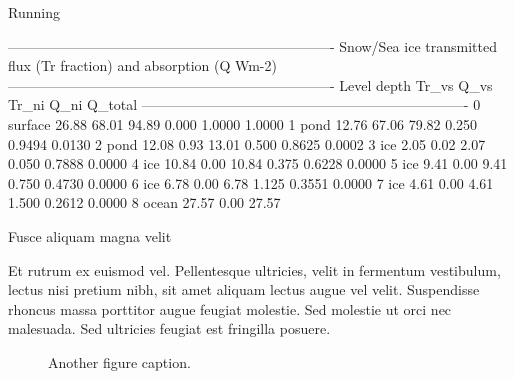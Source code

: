 \documentclass[final]{beamer}
\newlength{\colwidth}
\begin{document}
\begin{frame}[t,fragile]
\begin{columns}[t]
\begin{column}{\colwidth}
\begin{exampleblock}{Running }
\begin{python}
      ----------------------------------------------------------------------
      Snow/Sea ice transmitted flux (Tr fraction) and absorption (Q Wm-2)
      ----------------------------------------------------------------------
      Level      depth Tr\_vs  Q\_vs   Tr\_ni  Q\_ni   Q\_total
      ----------------------------------------------------------------------
      0 surface                  26.88         68.01  94.89
                 0.000 1.0000        1.0000
      1 pond                     12.76         67.06  79.82
                 0.250 0.9494        0.0130
      2 pond                     12.08          0.93  13.01
                 0.500 0.8625        0.0002
      3 ice                       2.05          0.02   2.07
                 0.050 0.7888        0.0000
      4 ice                      10.84          0.00  10.84
                 0.375 0.6228        0.0000
      5 ice                       9.41          0.00   9.41
                 0.750 0.4730        0.0000
      6 ice                       6.78          0.00   6.78
                 1.125 0.3551        0.0000
      7 ice                       4.61          0.00   4.61
                 1.500 0.2612        0.0000
      8 ocean                    27.57          0.00  27.57
    \end{python}
    

  \end{exampleblock}

  \begin{block}{Fusce aliquam magna velit}

    Et rutrum ex euismod vel. Pellentesque ultricies, velit in fermentum
    vestibulum, lectus nisi pretium nibh, sit amet aliquam lectus augue vel
    velit. Suspendisse rhoncus massa porttitor augue feugiat molestie. Sed
    molestie ut orci nec malesuada. Sed ultricies feugiat est fringilla
    posuere.

    \begin{figure}
      \centering
      \caption{Another figure caption.}
    \end{figure}


\end{block}
\end{column}
\end{columns}
\end{frame}
\end{document}
